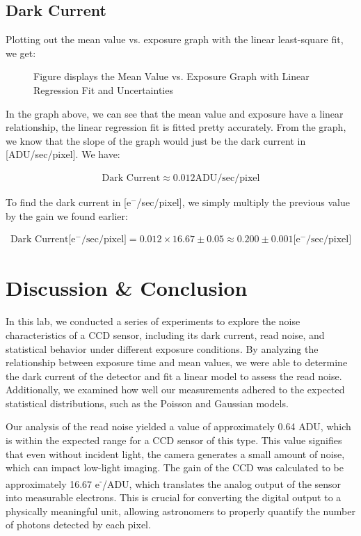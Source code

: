 \documentclass[10pt, preprint]{aastex}
\begin{document}
\subsection{Dark Current}

Plotting out the mean value vs. exposure graph with the linear least-square fit, we get:

\begin{figure}[H]
\caption{\label{darkgraph} Figure displays the Mean Value vs. Exposure Graph with Linear Regression Fit and Uncertainties}
\end{figure}

In the graph above, we can see that the mean value and exposure have a linear relationship, the linear regression fit is fitted pretty accurately. From the graph, we know that the slope of the graph would just be the dark current in [ADU/sec/pixel]. We have:

\begin{align*}
    \text{Dark Current} \approx 0.012 \text{ADU/sec/pixel}
\end{align*}

To find the dark current in [e$^-$/sec/pixel], we simply multiply the previous value by the gain we found earlier:

\begin{align*}
    \text{Dark Current[e$^-$/sec/pixel]} = 0.012 \times 16.67 \pm 0.05 \approx 0.200 \pm 0.001\text{[e$^-$/sec/pixel]}
\end{align*}

\section{Discussion \& Conclusion}\label{sec:conclusion}

In this lab, we conducted a series of experiments to explore the noise characteristics of a CCD sensor, including its dark current, read noise, and statistical behavior under different exposure conditions. By analyzing the relationship between exposure time and mean values, we were able to determine the dark current of the detector and fit a linear model to assess the read noise. Additionally, we examined how well our measurements adhered to the expected statistical distributions, such as the Poisson and Gaussian models.

Our analysis of the read noise yielded a value of approximately 0.64 ADU, which is within the expected range for a CCD sensor of this type. This value signifies that even without incident light, the camera generates a small amount of noise, which can impact low-light imaging. The gain of the CCD was calculated to be approximately 16.67 e\textsuperscript{-}/ADU, which translates the analog output of the sensor into measurable electrons. This is crucial for converting the digital output to a physically meaningful unit, allowing astronomers to properly quantify the number of photons detected by each pixel.
\end{document}
